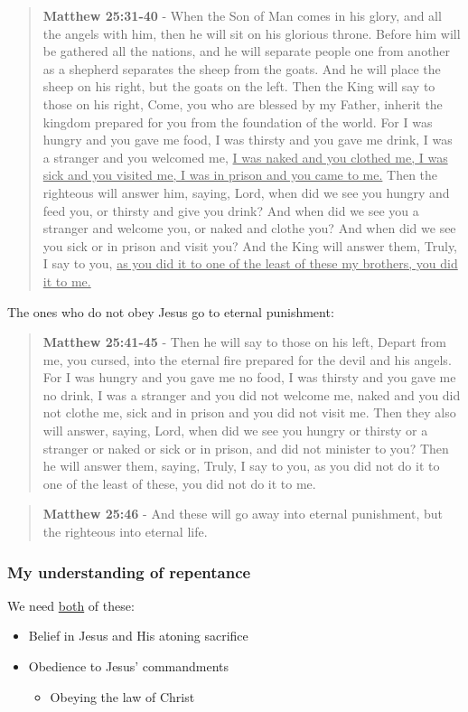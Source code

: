 \documentclass[11pt]{article}
\begin{document}
\begin{quote}
\textbf{Matthew 25:31-40} - When the Son of Man comes in his glory, and all the angels with him, then he will sit on his glorious throne. Before him will be gathered all the nations, and he will separate people one from another as a shepherd separates the sheep from the goats. And he will place the sheep on his right, but the goats on the left. Then the King will say to those on his right, Come, you who are blessed by my Father, inherit the kingdom prepared for you from the foundation of the world. For I was hungry and you gave me food, I was thirsty and you gave me drink, I was a stranger and you welcomed me, \uline{I was naked and you clothed me, I was sick and you visited me, I was in prison and you came to me.} Then the righteous will answer him, saying, Lord, when did we see you hungry and feed you, or thirsty and give you drink? And when did we see you a stranger and welcome you, or naked and clothe you? And when did we see you sick or in prison and visit you? And the King will answer them, Truly, I say to you, \uline{as you did it to one of the least of these my brothers, you did it to me.}
\end{quote}

The ones who do not obey Jesus go to eternal punishment:

\begin{quote}
\textbf{Matthew 25:41-45} - Then he will say to those on his left, Depart from me, you cursed, into the eternal fire prepared for the devil and his angels. For I was hungry and you gave me no food, I was thirsty and you gave me no drink, I was a stranger and you did not welcome me, naked and you did not clothe me, sick and in prison and you did not visit me. Then they also will answer, saying, Lord, when did we see you hungry or thirsty or a stranger or naked or sick or in prison, and did not minister to you? Then he will answer them, saying, Truly, I say to you, as you did not do it to one of the least of these, you did not do it to me.
\end{quote}

\begin{quote}
\textbf{Matthew 25:46} - And these will go away into eternal punishment, but the righteous into eternal life.
\end{quote}

\subsubsection{My understanding of repentance}
\label{sec:orgc4d162e}
We need \uline{both} of these:
\begin{itemize}
\item Belief in Jesus and His atoning sacrifice
\item Obedience to Jesus' commandments
\begin{itemize}
\item Obeying the law of Christ
\end{itemize}
\end{itemize}
\end{document}
